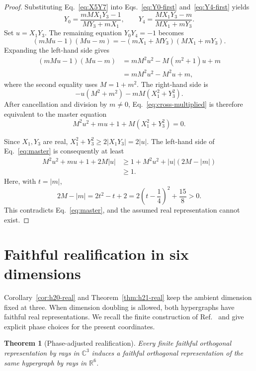 \documentclass[twocolumn,aps,pra,floatfix,amsmath,amssymb,longbibliography]{revtex4-2}
\newtheorem{theorem}{Theorem}
\theoremstyle{definition}
\theoremstyle{remark}
\newcommand{\C}{\mathbb C}
\newcommand{\R}{\mathbb R}
\begin{document}
\begin{proof}
Substituting Eq.~\eqref{eq:X5Y7} into
Eqs.~\eqref{eq:Y0-first} and~\eqref{eq:Y4-first} yields
\begin{equation}
 Y_0=\frac{mMX_1Y_3-1}{MY_3+mX_1},\qquad
 Y_4=\frac{MX_1Y_3-m}{MX_1+mY_3}.
 \label{eq:Y0Y4-final}
\end{equation}
Set $u=X_1Y_3$.  The remaining equation $Y_0Y_4=-1$ becomes
\begin{equation}
 (mMu-1)(Mu-m)=-(mX_1+MY_3)(MX_1+mY_3).
 \label{eq:cross-multiplied}
\end{equation}
Expanding the left-hand side gives
\begin{align*}
 (mMu-1)(Mu-m)
 &=mM^2u^2-M(m^2+1)u+m\\
 &=mM^2u^2-M^2u+m,
\end{align*}
where the second equality uses $M=1+m^2$.
The right-hand side is
\[
 -u(M^2+m^2)-mM(X_1^2+Y_3^2).
\]
After cancellation and division by $m\ne0$, Eq.~\eqref{eq:cross-multiplied}
is therefore equivalent to the master equation
\begin{equation}
 M^2u^2+mu+1+M(X_1^2+Y_3^2)=0.
 \label{eq:master}
\end{equation}

Since $X_1,Y_3$ are real,
$X_1^2+Y_3^2\ge2|X_1Y_3|=2|u|$.  The left-hand side of
Eq.~\eqref{eq:master} is consequently at least
\begin{align*}
 M^2u^2+mu+1+2M|u|
 &\ge 1+M^2u^2+|u|(2M-|m|)\\
 &\ge1.
\end{align*}
Here, with $t=|m|$,
\[
 2M-|m|=2t^2-t+2=2\left(t-\frac14\right)^2+\frac{15}{8}>0.
\]
This contradicts
Eq.~\eqref{eq:master}, and the assumed real representation cannot exist.
\end{proof}

\section{Faithful realification in six dimensions}
\label{sec:realification}

Corollary~\ref{cor:h20-real} and Theorem~\ref{thm:h21-real} keep the ambient
dimension fixed at three.  When dimension doubling is allowed, both
hypergraphs have faithful real representations.  We recall the finite
construction of Ref.~\cite{svozil-2025-rvc} and give explicit phase choices
for the present coordinates.

\begin{theorem}[Phase-adjusted realification]
\label{thm:realification}
Every finite faithful orthogonal representation by rays in $\C^3$ induces a
faithful orthogonal representation of the same hypergraph by rays in $\R^6$.
\end{theorem}
\end{document}
